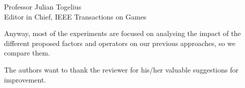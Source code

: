 \documentclass[10pt]{letter} %
\begin{document}
\begin{letter}{Professor Julian Togelius \\ Editor in Chief, IEEE Transactions on Games}
\begin{enumerate}
\begin{itemize}
Anyway, most of the experiments are focused on analysing the impact of the different proposed factors and operators on our previous approaches, so we compare them. 
		
	\end{itemize}					

The authors want to thank the reviewer for his/her valuable suggestions for improvement.


\end{enumerate}
 


\end{letter}
\end{document}
